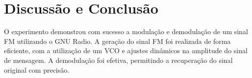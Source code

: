 \section{Discussão e Conclusão}

O experimento demonstrou com sucesso a modulação e demodulação de um sinal FM utilizando o GNU Radio. A geração do sinal FM foi realizada de forma eficiente, com a utilização de um VCO e ajustes dinâmicos na amplitude do sinal de mensagem. A demodulação foi efetiva, permitindo a recuperação do sinal original com precisão.